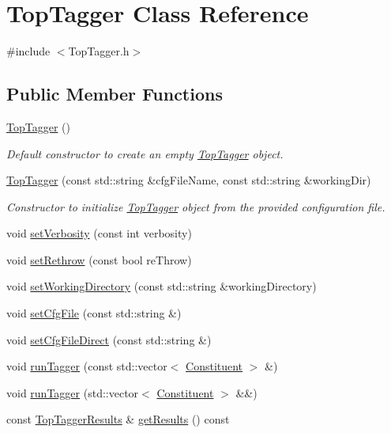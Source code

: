 \hypertarget{classTopTagger}{\section{Top\-Tagger Class Reference}
\label{classTopTagger}
}


{\ttfamily \#include $<$Top\-Tagger.\-h$>$}

\subsection*{Public Member Functions}
\begin{DoxyCompactItemize}
\item 
\hypertarget{classTopTagger_a26e4654b1eef1f7e7dcffeb02b9fc41b}{\hyperlink{classTopTagger_a26e4654b1eef1f7e7dcffeb02b9fc41b}{Top\-Tagger} ()}\label{classTopTagger_a26e4654b1eef1f7e7dcffeb02b9fc41b}

\begin{DoxyCompactList}\small\item\em Default constructor to create an empty \hyperlink{classTopTagger}{Top\-Tagger} object. \end{DoxyCompactList}\item 
\hypertarget{classTopTagger_a21e38d6b697bc079ab6fb0eb7a1ea3bb}{\hyperlink{classTopTagger_a21e38d6b697bc079ab6fb0eb7a1ea3bb}{Top\-Tagger} (const std\-::string \&cfg\-File\-Name, const std\-::string \&working\-Dir)}\label{classTopTagger_a21e38d6b697bc079ab6fb0eb7a1ea3bb}

\begin{DoxyCompactList}\small\item\em Constructor to initialize \hyperlink{classTopTagger}{Top\-Tagger} object from the provided configuration file. \end{DoxyCompactList}\item 
void \hyperlink{classTopTagger_ad7e22571559cb7afe0f0cf0e14d1ef41}{set\-Verbosity} (const int verbosity)
\item 
void \hyperlink{classTopTagger_ae117c09fc42674a09247fd1ad8dcb3ce}{set\-Rethrow} (const bool re\-Throw)
\item 
void \hyperlink{classTopTagger_ae03dce4873628bfd529924a9004b3304}{set\-Working\-Directory} (const std\-::string \&working\-Directory)
\item 
void \hyperlink{classTopTagger_ac18bfe0673dbd05973f45c668ed2b190}{set\-Cfg\-File} (const std\-::string \&)
\item 
void \hyperlink{classTopTagger_ae7a38be12023643495adea6f9a696ff3}{set\-Cfg\-File\-Direct} (const std\-::string \&)
\item 
void \hyperlink{classTopTagger_accf43da3b1469e524bfe6f568116219a}{run\-Tagger} (const std\-::vector$<$ \hyperlink{classConstituent}{Constituent} $>$ \&)
\item 
void \hyperlink{classTopTagger_ac4d5c2b7983a99495fa6cfa7e0287e74}{run\-Tagger} (std\-::vector$<$ \hyperlink{classConstituent}{Constituent} $>$ \&\&)
\item 
const \hyperlink{classTopTaggerResults}{Top\-Tagger\-Results} \& \hyperlink{classTopTagger_ac6f06aeb683b0b761ad09ac018e11d08}{get\-Results} () const 
\end{DoxyCompactItemize}


